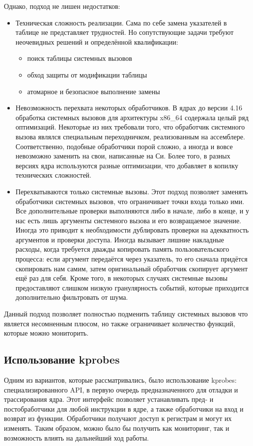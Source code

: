 Однако, подход не лишен недостатков:
\begin{itemize}
	\item Техническая сложность реализации. Сама по себе замена указателей в таблице не представляет трудностей. Но сопутствующие задачи требуют неочевидных решений и определённой квалификации:
	\begin{itemize}
		\item поиск таблицы системных вызовов
		\item обход защиты от модификации таблицы
		\item атомарное и безопасное выполнение замены
	\end{itemize}
	\item Невозможность перехвата некоторых обработчиков. В ядрах до версии 4.16 обработка системных вызовов для архитектуры x86\_64 содержала целый ряд оптимизаций. Некоторые из них требовали того, что обработчик системного вызова являлся специальным переходничком, реализованным на ассемблере. Соответственно, подобные обработчики порой сложно, а иногда и вовсе невозможно заменить на свои, написанные на Си. Более того, в разных версиях ядра используются разные оптимизации, что добавляет в копилку технических сложностей.
	\item Перехватываются только системные вызовы. Этот подход позволяет заменять обработчики системных вызовов, что ограничивает точки входа только ими. Все дополнительные проверки выполняются либо в начале, либо в конце, и у нас есть лишь аргументы системного вызова и его возвращаемое значение. Иногда это приводит к необходимости дублировать проверки на адекватность аргументов и проверки доступа. Иногда вызывает лишние накладные расходы, когда требуется дважды копировать память пользовательского процесса: если аргумент передаётся через указатель, то его сначала придётся скопировать нам самим, затем оригинальный обработчик скопирует аргумент ещё раз для себя. Кроме того, в некоторых случаях системные вызовы предоставляют слишком низкую гранулярность событий, которые приходится дополнительно фильтровать от шума.
\end{itemize}

Данный подход позволяет полностью подменить таблицу системных вызовов что является несомненным плюсом, но также ограничивает количество функций, которые можно мониторить.

\subsection{Использование kprobes}
Одним из вариантов, которые рассматривались, было использование kprobes: специализированного API, в первую очередь предназначенного для отладки и трассирования ядра. Этот интерфейс позволяет устанавливать пред- и постобработчики для любой инструкции в ядре, а также обработчики на вход и возврат из функции. Обработчики получают доступ к регистрам и могут их изменять. Таким образом, можно было бы получить как мониторинг, так и возможность влиять на дальнейший ход работы.

